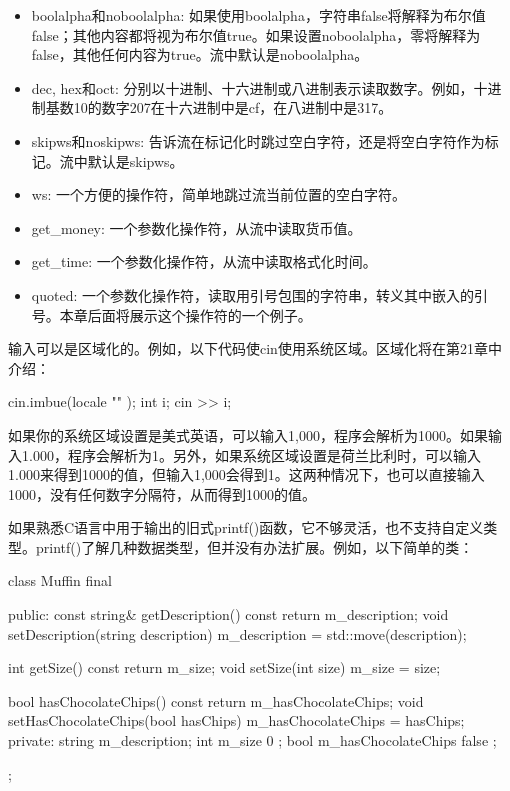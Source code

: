 \begin{itemize}
\item
boolalpha和noboolalpha: 如果使用boolalpha，字符串false将解释为布尔值false；其他内容都将视为布尔值true。如果设置noboolalpha，零将解释为false，其他任何内容为true。流中默认是noboolalpha。

\item
dec, hex和oct: 分别以十进制、十六进制或八进制表示读取数字。例如，十进制基数10的数字207在十六进制中是cf，在八进制中是317。

\item
skipws和noskipws: 告诉流在标记化时跳过空白字符，还是将空白字符作为标记。流中默认是skipws。

\item
ws: 一个方便的操作符，简单地跳过流当前位置的空白字符。

\item
get\_money: 一个参数化操作符，从流中读取货币值。

\item
get\_time: 一个参数化操作符，从流中读取格式化时间。

\item
quoted: 一个参数化操作符，读取用引号包围的字符串，转义其中嵌入的引号。本章后面将展示这个操作符的一个例子。
\end{itemize}

输入可以是区域化的。例如，以下代码使cin使用系统区域。区域化将在第21章中介绍：

\begin{cpp}
cin.imbue(locale { "" });
int i;
cin >> i;
\end{cpp}

如果你的系统区域设置是美式英语，可以输入1,000，程序会解析为1000。如果输入1.000，程序会解析为1。另外，如果系统区域设置是荷兰比利时，可以输入1.000来得到1000的值，但输入1,000会得到1。这两种情况下，也可以直接输入1000，没有任何数字分隔符，从而得到1000的值。


如果熟悉C语言中用于输出的旧式printf()函数，它不够灵活，也不支持自定义类型。printf()了解几种数据类型，但并没有办法扩展。例如，以下简单的类：

\begin{cpp}
class Muffin final
{
    public:
        const string& getDescription() const { return m_description; }
        void setDescription(string description)
        {
            m_description = std::move(description);
        }

        int getSize() const { return m_size; }
        void setSize(int size) { m_size = size; }

        bool hasChocolateChips() const { return m_hasChocolateChips; }
        void setHasChocolateChips(bool hasChips)
        {
            m_hasChocolateChips = hasChips;
        }
    private:
        string m_description;
        int m_size { 0 };
        bool m_hasChocolateChips { false };
};
\end{cpp}

